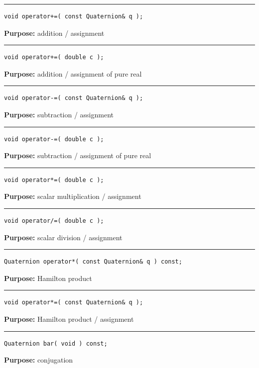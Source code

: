 \documentclass{article}
\begin{document}
\hspace{-.21in}\rule{5in}{1pt}
\begin{verbatim}
void operator+=( const Quaternion& q );
\end{verbatim}
\textbf{Purpose:}
addition / assignment

\hspace{-.21in}\rule{5in}{1pt}
\begin{verbatim}
void operator+=( double c );
\end{verbatim}
\textbf{Purpose:}
addition / assignment of pure real

\hspace{-.21in}\rule{5in}{1pt}
\begin{verbatim}
void operator-=( const Quaternion& q );
\end{verbatim}
\textbf{Purpose:}
subtraction / assignment

\hspace{-.21in}\rule{5in}{1pt}
\begin{verbatim}
void operator-=( double c );
\end{verbatim}
\textbf{Purpose:}
subtraction / assignment of pure real

\hspace{-.21in}\rule{5in}{1pt}
\begin{verbatim}
void operator*=( double c );
\end{verbatim}
\textbf{Purpose:}
scalar multiplication / assignment

\hspace{-.21in}\rule{5in}{1pt}
\begin{verbatim}
void operator/=( double c );
\end{verbatim}
\textbf{Purpose:}
scalar division / assignment

\hspace{-.21in}\rule{5in}{1pt}
\begin{verbatim}
Quaternion operator*( const Quaternion& q ) const;
\end{verbatim}
\textbf{Purpose:}
Hamilton product

\hspace{-.21in}\rule{5in}{1pt}
\begin{verbatim}
void operator*=( const Quaternion& q );
\end{verbatim}
\textbf{Purpose:}
Hamilton product / assignment

\hspace{-.21in}\rule{5in}{1pt}
\begin{verbatim}
Quaternion bar( void ) const;
\end{verbatim}
\textbf{Purpose:}
conjugation
\end{document}
